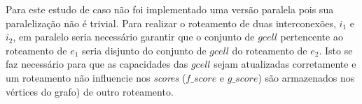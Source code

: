 Para este estudo de caso não foi implementado uma versão paralela pois sua paralelização não é trivial.
Para realizar o roteamento de duas interconexões, $i_1$ e $i_2$, em paralelo seria necessário garantir que o conjunto de $gcell$ pertencente ao roteamento de $e_1$ seria disjunto do conjunto de $gcell$ do roteamento de $e_2$.
Isto se faz necessário para que as capacidades das $gcell$ sejam atualizadas corretamente e um roteamento não influencie nos \textit{scores} ($f\_score$ e $g\_score$) são armazenados nos vértices do grafo) de outro roteamento.